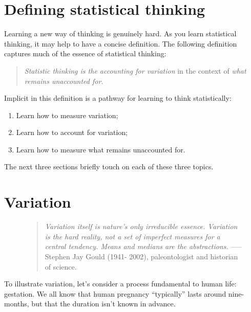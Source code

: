 \documentclass[
  letterpaper,
  DIV=11,
  numbers=noendperiod,
  oneside]{scrreprt}
\providecommand{\tightlist}{%
  \setlength{\itemsep}{0pt}\setlength{\parskip}{0pt}}\usepackage{longtable,booktabs,array}
\begin{document}
\hypertarget{defining-statistical-thinking}{%
\section{Defining statistical
thinking}\label{defining-statistical-thinking}}

Learning a new way of thinking is genuinely hard. As you learn
statistical thinking, it may help to have a concise definition. The
following definition captures much of the essence of statistical
thinking:

\begin{quote}
\emph{Statistic thinking is the accounting for variation} in the context
of \emph{what remains unaccounted for.}
\end{quote}

Implicit in this definition is a pathway for learning to think
statistically:

\begin{enumerate}
\def\labelenumi{\arabic{enumi}.}
\tightlist
\item
  Learn how to measure variation;
\item
  Learn how to account for variation;
\item
  Learn how to measure what remains unaccounted for.
\end{enumerate}

The next three sections briefly touch on each of these three topics.

\hypertarget{variation}{%
\section{Variation}\label{variation}}

\begin{figure}

\begin{quote}
\emph{Variation itself is nature's only irreducible essence. Variation
is the hard reality, not a set of imperfect measures for a central
tendency. Means and medians are the abstractions.} ----- Stephen Jay
Gould (1941- 2002), paleontologist and historian of science.
\end{quote}

\end{figure}

To illustrate variation, let's consider a process fundamental to human
life: gestation. We all know that human pregnancy ``typically'' lasts
around nine-months, but that the duration isn't known in advance.
\end{document}
